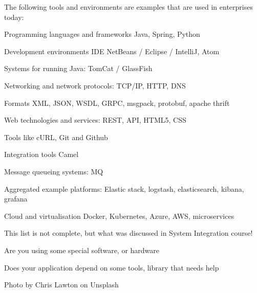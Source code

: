 \documentclass[Screen16to9,17pt]{foils}
\begin{document}
The following tools and environments are examples that are used in enterprises today:

\begin{list2}
\item Programming languages and frameworks Java, Spring, Python
\item Development environments IDE NetBeans / Eclipse / IntelliJ, Atom
\item Systems for running Java: TomCat / GlassFish
\item Networking and network protocols: TCP/IP, HTTP, DNS
\item Formats XML, JSON, WSDL, GRPC, msgpack, protobuf, apache thrift
\item Web technologies and services: REST, API, HTML5, CSS
\item Tools like cURL, Git and Github
\item Integration tools Camel
\item Message queueing systems: MQ
\item Aggregated example platforms: Elastic stack, logstash, elasticsearch, kibana, grafana
\item Cloud and virtualisation Docker, Kubernetes, Azure, AWS, microservices
\end{list2}

\centerline{This list is not complete, but what was discussed in System Integration course!}






\begin{list2}
\item Are you using some special software, or hardware
\item Does your application depend on some tools, library that needs help
\end{list2}







Photo by Chris Lawton on Unsplash

\end{document}
